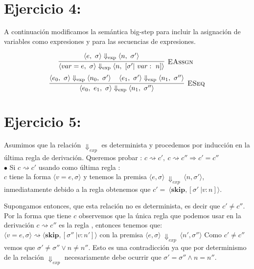 \documentclass[11pt, fleqn]{article}
\begin{document}

\section*{Ejercicio 4:}

A continuación modificamos la semántica big-step para incluir la asignación de variables como
expresiones y para las secuencias de expresiones.

\[
\infr[\rn{EAssgn}]
  {
    \sexp{\pair{e}{\sigma}}{\pair{n}{\sigma'}}
  }
  {
    \sexp{\pair{\eassgn{var}{e}}{\sigma}}{\pair{n}{\extf{\sigma'}{var}{n}}}
  }
\
\]
\smallskip
\[
\infr[\rn{ESeq}]
  {
    \sexp{\pair{e_0}{\sigma}}{\pair{n_0}{\sigma'}}
    \quad
    \sexp{\pair{e_1}{\sigma'}}{\pair{n_1}{\sigma''}}
  }
  {
    \sexp{\pair{\eseq{e_0}{e_1}}{\sigma}}{\pair{n_1}{\sigma''}}
  }
\]


\section*{Ejercicio 5:}

Asumimos que la relación $\Downarrow_{exp}$ es determinista y procedemos por inducción
en la última regla de derivación.
Queremos probar : $ c \rightsquigarrow c', \: c \rightsquigarrow c'' \Rightarrow c' = c'' $ \\

$\bullet$ Si $ c \rightsquigarrow c' $ usando como última regla : \\
$c$ tiene la forma $\langle v=e, \sigma \rangle$ y tenemos la premisa
$\langle e, \sigma \rangle \: \Downarrow_{exp} \: \langle n, \sigma' \rangle$,
inmediatamente debido a la regla \rn{Ass} obtenemos que
$c' = \: \langle \textbf{skip}, [\sigma' \: \vert v : n] \rangle$.

Supongamos entonces, que esta relación no es determinista, es decir que $ c' \neq c'' $.
Por la forma que tiene $c$ observemos que la única regla que podemos usar en la
derivación $ c \rightsquigarrow c'' $ es la regla \rn{Ass}, entonces tenemos que:
$ \langle v=e, \sigma \rangle \rightsquigarrow \langle \textbf{skip}, [\sigma'' \: \vert v : n'] \rangle$
con la premisa $\langle e, \sigma \rangle \: \Downarrow_{exp} \: \langle n', \sigma'' \rangle$
Como $ c' \neq c'' $ vemos que $ \sigma' \neq \sigma'' \lor n \neq n''$.
Esto es una contradicción ya que por determinismo de la relación $\Downarrow_{exp}$ 
necesariamente debe ocurrir que $ \sigma' = \sigma'' \land n = n''$. \\
\end{document}
